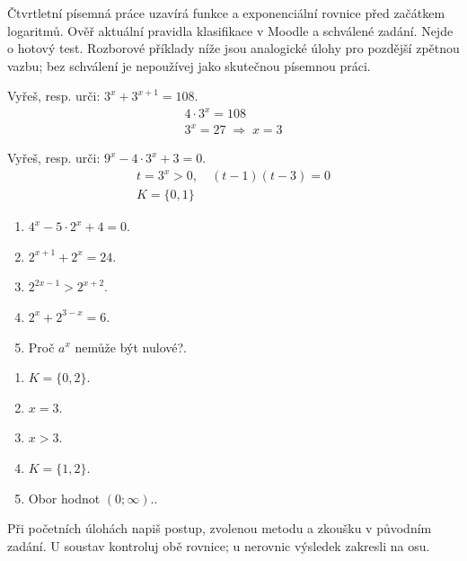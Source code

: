 \documentclass[11pt,a4paper]{article}
\begin{document}
Čtvrtletní písemná práce uzavírá funkce a exponenciální rovnice před začátkem logaritmů. Ověř aktuální pravidla klasifikace v Moodle a schválené zadání.
Nejde o hotový test. Rozborové příklady níže jsou analogické úlohy pro pozdější zpětnou vazbu; bez schválení je nepoužívej jako skutečnou písemnou práci.
\begin{prikladReseniBox}[title={Příklad 1}]
Vyřeš, resp. urči: $3^x+3^{x+1}=108$.
\tcblower
\[\begin{aligned}4\cdot3^x=108 \\ 3^x=27\;\Longrightarrow\;x=3\end{aligned}\]
\end{prikladReseniBox}
\begin{prikladReseniBox}[title={Příklad 2}]
Vyřeš, resp. urči: $9^x-4\cdot3^x+3=0$.
\tcblower
\[\begin{aligned}t=3^x>0,\quad (t-1)(t-3)=0 \\ K=\{0,1\}\end{aligned}\]
\end{prikladReseniBox}
\begin{zadaniReseniBox}[title={Samostatná práce 1}]
\begin{enumerate}[label=\alph*)]
\item $4^x-5\cdot2^x+4=0$.
\item $2^{x+1}+2^x=24$.
\item $2^{2x-1}>2^{x+2}$.
\item $2^x+2^{3-x}=6$.
\item Proč $a^x$ nemůže být nulové?.
\end{enumerate}
\tcblower
\begin{enumerate}[label=\alph*)]
\item $K=\{0,2\}$.
\item $x=3$.
\item $x>3$.
\item $K=\{1,2\}$.
\item Obor hodnot $(0;\infty)$..
\end{enumerate}
\end{zadaniReseniBox}
Při početních úlohách napiš postup, zvolenou metodu a zkoušku v původním zadání. U soustav kontroluj obě rovnice; u nerovnic výsledek zakresli na osu.
\end{document}
